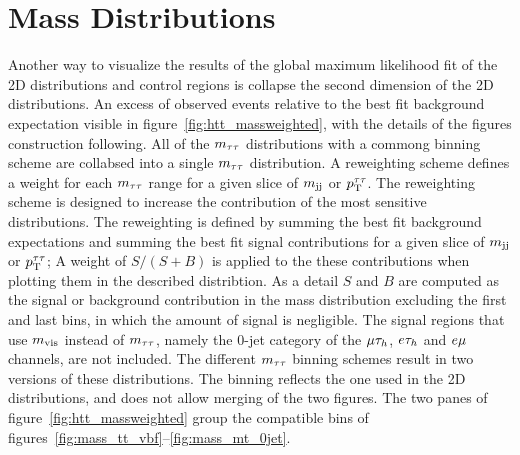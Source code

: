 \section{Mass Distributions}
Another way to visualize the results of the global maximum likelihood fit of the 2D distributions and control
regions is collapse the second dimension of the 2D distributions.
An excess of observed events relative to the best fit background expectation visible in figure~\ref{fig:htt_massweighted},
with the details of the figures construction following.
All of the $m_{\tau\tau}$ distributions with a commong binning scheme are collabsed into a single $m_{\tau\tau}$ distribution.
A reweighting scheme defines a weight for each $m_{\tau\tau}$ range for a given slice of $m_\mathrm{jj}$ or $p_\mathrm{T}^{\tau\tau}$. The reweighting
scheme is designed to increase the contribution of the most sensitive distributions. The reweighting is defined
by summing the best fit background expectations and summing the best fit signal contributions for a given slice
of $m_\mathrm{jj}$ or $p_\mathrm{T}^{\tau\tau}$; A weight of $S/(S+B)$ is applied to the these contributions when plotting them in the described
distribtion. As a detail $S$ and $B$ are computed as the signal or background contribution in the mass distribution 
excluding the first and last bins, in which the amount of signal is negligible. 
The signal regions that use $m_\text{vis}$ instead 
of $m_{\tau\tau}$, namely the 0-jet category of the $\mu\tau_{h}$, $e\tau_{h}$ and $e\mu$ channels, are not included. 
The different $m_{\tau\tau}$ binning schemes result in two versions of these distributions.
The binning reflects the one used in the 2D 
distributions, and does not allow merging of the two figures. 
The two panes of figure~\ref{fig:htt_massweighted} group the compatible bins of 
figures~\ref{fig:mass_tt_vbf}--\ref{fig:mass_mt_0jet}.

